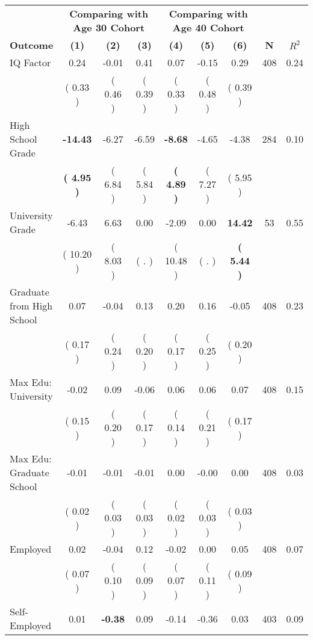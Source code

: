 \begin{tabular}{lcccccccc}
\toprule
 & \multicolumn{3}{c}{\textbf{Comparing with Age 30 Cohort}} & \multicolumn{3}{c}{\textbf{Comparing with Age 40 Cohort}} & \\
\cmidrule(lr){2-4} \cmidrule(lr){5-7} 
 \textbf{Outcome} & \textbf{(1)} & \textbf{(2)} & \textbf{(3)} & \textbf{(4)} & \textbf{(5)} & \textbf{(6)} & \textbf{N} & \textbf{$ R^2$} \\
\midrule
IQ Factor &      0.24 &     -0.01 &      0.41 &      0.07 &     -0.15 &      0.29 & 408 &       0.24 \\ 
 & (     0.33 ) & (     0.46 ) & (     0.39 ) & (     0.33 ) & (     0.48 ) & (     0.39 ) & \\
High School Grade & \textbf{   -14.43} &     -6.27 &     -6.59 & \textbf{    -8.68} &     -4.65 &     -4.38 & 284 &       0.10 \\ 
 & \textbf{(     4.95 )} & (     6.84 ) & (     5.84 ) & \textbf{(     4.89 )} & (     7.27 ) & (     5.95 ) & \\
University Grade &     -6.43 &      6.63 &      0.00 &     -2.09 &      0.00 & \textbf{    14.42} & 53 &       0.55 \\ 
 & (    10.20 ) & (     8.03 ) & (        . ) & (    10.48 ) & (        . ) & \textbf{(     5.44 )} & \\
Graduate from High School &      0.07 &     -0.04 &      0.13 &      0.20 &      0.16 &     -0.05 & 408 &       0.23 \\ 
 & (     0.17 ) & (     0.24 ) & (     0.20 ) & (     0.17 ) & (     0.25 ) & (     0.20 ) & \\
Max Edu: University &     -0.02 &      0.09 &     -0.06 &      0.06 &      0.06 &      0.07 & 408 &       0.15 \\ 
 & (     0.15 ) & (     0.20 ) & (     0.17 ) & (     0.14 ) & (     0.21 ) & (     0.17 ) & \\
Max Edu: Graduate School &     -0.01 &     -0.01 &     -0.01 &      0.00 &     -0.00 &      0.00 & 408 &       0.03 \\ 
 & (     0.02 ) & (     0.03 ) & (     0.03 ) & (     0.02 ) & (     0.03 ) & (     0.03 ) & \\
Employed &      0.02 &     -0.04 &      0.12 &     -0.02 &      0.00 &      0.05 & 408 &       0.07 \\ 
 & (     0.07 ) & (     0.10 ) & (     0.09 ) & (     0.07 ) & (     0.11 ) & (     0.09 ) & \\
Self-Employed &      0.01 & \textbf{    -0.38} &      0.09 &     -0.14 &     -0.36 &      0.03 & 403 &       0.09 \\ 

\end{tabular}
